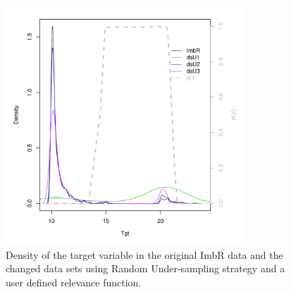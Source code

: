 \documentclass[10pt,a4paper]{article}\usepackage[]{graphicx}\usepackage[]{color}
\newenvironment{knitrout}{}{} %
\begin{document}
\begin{knitrout}\footnotesize
{}\color{fgcolor}\begin{figure}

{\centering \includegraphics[width=0.8\textwidth]{figures/UBL-I_u_RU1-1} 

}

\caption[Density of the target variable in the original ImbR data and the changed data sets using Random Under-sampling strategy and a user defined relevance function]{Density of the target variable in the original ImbR data and the changed data sets using Random Under-sampling strategy and a user defined relevance function.}\label{fig:I_u_RU1}
\end{figure}


\end{knitrout}
\end{document}
